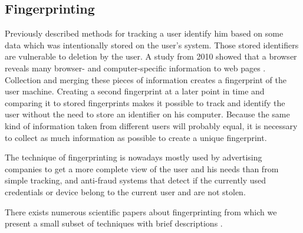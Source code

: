 	

\subsection{Fingerprinting}

	Previously described methods for tracking a user identify him based on some data which was intentionally stored on the user's system. Those stored identifiers are vulnerable to deletion by the user. A study from 2010 showed that a browser reveals many browser- and computer-specific information to web pages \cite{Eckersley:2010:UYW:1881151.1881152}. Collection and merging these pieces of information creates a fingerprint of the user machine. Creating a second fingerprint at a later point in time and comparing it to stored fingerprints makes it possible to track and identify the user without the need to store an identifier on his computer. Because the same kind of information taken from different users will probably equal, it is necessary to collect as much information as possible to create a unique fingerprint. 
	
	The technique of fingerprinting is nowadays mostly used by advertising companies to get a more complete view of the user and his needs than from simple tracking, and anti-fraud systems that detect if the currently used credentials or device belong to the current user and are not stolen.

	There exists numerous scientific papers about fingerprinting from which we present a small subset of techniques with brief descriptions \cite{paulstone_historysniffing, MBYS11, Nikiforakis:2013:CME:2497621.2498133, Eckersley:2010:UYW:1881151.1881152, MS12, olejnik:hal-00747841}. 
	
